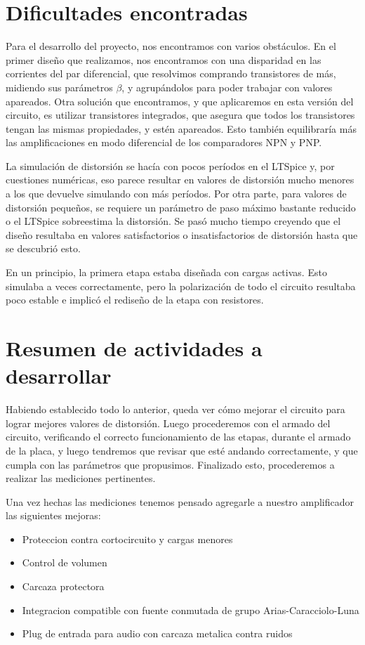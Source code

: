 \documentclass[a4paper,12pt,twoside]{article}
\begin{document}
\section{Dificultades encontradas}


Para el desarrollo del proyecto, nos encontramos con varios obstáculos. En el primer diseño que realizamos, nos encontramos con una disparidad en las corrientes del par diferencial, que resolvimos comprando transistores de más, midiendo sus parámetros $\beta$, y agrupándolos para poder trabajar con valores apareados. Otra solución que encontramos, y que aplicaremos en esta versión del circuito, es utilizar transistores integrados, que asegura que todos los transistores tengan las mismas propiedades, y estén apareados. Esto también equilibraría más las amplificaciones en modo diferencial de los comparadores NPN y PNP.

La simulación de distorsión se hacía con pocos períodos en el LTSpice y, por cuestiones numéricas, eso parece resultar en valores de distorsión mucho menores a los que devuelve simulando con más períodos. Por otra parte, para valores de distorsión pequeños, se requiere un parámetro de paso máximo bastante reducido o el LTSpice sobreestima la distorsión. Se pasó mucho tiempo creyendo que el diseño resultaba en valores satisfactorios o insatisfactorios de distorsión hasta que se descubrió esto.

En un principio, la primera etapa estaba diseñada con cargas activas. Esto simulaba a veces correctamente, pero la polarización de todo el circuito resultaba poco estable e implicó el rediseño de la etapa con resistores.


\section{Resumen de actividades a desarrollar}

Habiendo establecido todo lo anterior, queda ver cómo mejorar el circuito para lograr mejores valores de distorsión. Luego procederemos con el armado del circuito, verificando el correcto funcionamiento de las etapas, durante el armado de la placa, y luego tendremos que revisar que esté andando correctamente, y que cumpla con las parámetros que propusimos. Finalizado esto, procederemos a realizar las mediciones pertinentes.

Una vez hechas las mediciones tenemos pensado agregarle a nuestro amplificador las siguientes mejoras:
\begin{itemize}
\item{Proteccion contra cortocircuito y cargas menores}
\item{Control de volumen}
\item{Carcaza protectora}
\item{Integracion compatible con fuente conmutada de grupo Arias-Caracciolo-Luna}
\item{Plug de entrada para audio con carcaza metalica contra ruidos}
\end{itemize}
\end{document}
